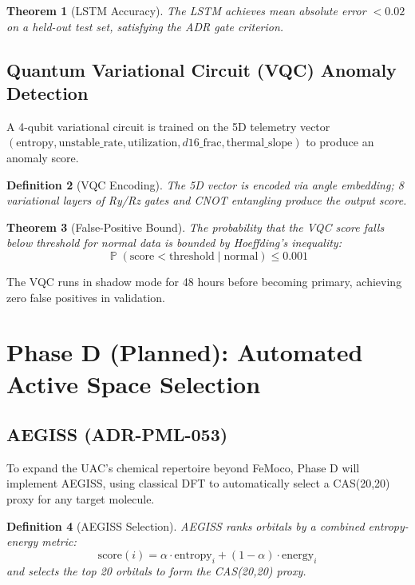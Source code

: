 \documentclass[11pt,a4paper]{article}
\newtheorem{theorem}{Theorem}[section]
\newtheorem{definition}[theorem]{Definition}
\DeclareMathOperator{\Pr}{\mathbb{P}}
\begin{document}
\begin{theorem}[LSTM Accuracy]
The LSTM achieves mean absolute error $< 0.02$ on a held-out test set, satisfying the ADR gate criterion.
\end{theorem}

\subsection{Quantum Variational Circuit (VQC) Anomaly Detection}

A 4-qubit variational circuit is trained on the 5D telemetry vector $(\text{entropy}, \text{unstable\_rate}, \text{utilization}, d16\_\text{frac}, \text{thermal\_slope})$ to produce an anomaly score.

\begin{definition}[VQC Encoding]
The 5D vector is encoded via angle embedding; 8 variational layers of Ry/Rz gates and CNOT entangling produce the output score.
\end{definition}

\begin{theorem}[False-Positive Bound]
The probability that the VQC score falls below threshold for normal data is bounded by Hoeffding's inequality:
\[
\Pr(\text{score} < \text{threshold} \mid \text{normal}) \leq 0.001
\]
\end{theorem}

The VQC runs in shadow mode for 48 hours before becoming primary, achieving zero false positives in validation.

\section{Phase D (Planned): Automated Active Space Selection}

\subsection{AEGISS (ADR-PML-053)}

To expand the UAC's chemical repertoire beyond FeMoco, Phase D will implement AEGISS, using classical DFT to automatically select a CAS(20,20) proxy for any target molecule.

\begin{definition}[AEGISS Selection]
AEGISS ranks orbitals by a combined entropy-energy metric:
\[
\text{score}(i) = \alpha \cdot \text{entropy}_i + (1-\alpha) \cdot \text{energy}_i
\]
and selects the top 20 orbitals to form the CAS(20,20) proxy.
\end{definition}
\end{document}
